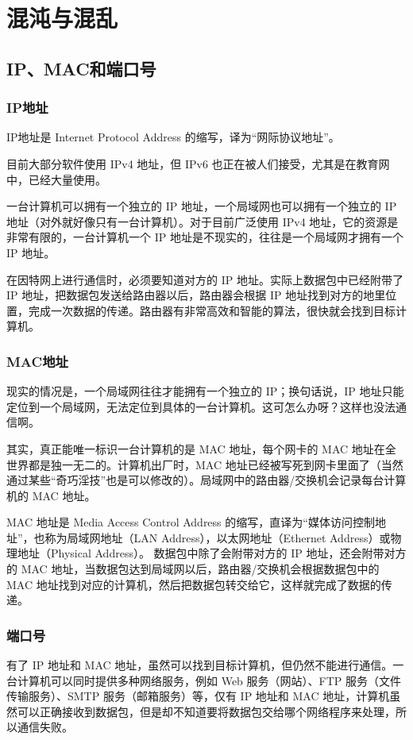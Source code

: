 \documentclass[cn,chinese,color=cyan]{elegantbook}
\begin{document}
\chapter{混沌与混乱}
\section{IP、MAC和端口号}

\subsection{IP地址}

IP地址是 Internet Protocol Address 的缩写，译为“网际协议地址”。

目前大部分软件使用 IPv4 地址，但 IPv6 也正在被人们接受，尤其是在教育网中，已经大量使用。

一台计算机可以拥有一个独立的 IP 地址，一个局域网也可以拥有一个独立的 IP 地址（对外就好像只有一台计算机）。对于目前广泛使用 IPv4 地址，它的资源是非常有限的，一台计算机一个 IP 地址是不现实的，往往是一个局域网才拥有一个 IP 地址。

在因特网上进行通信时，必须要知道对方的 IP 地址。实际上数据包中已经附带了 IP 地址，把数据包发送给路由器以后，路由器会根据 IP 地址找到对方的地里位置，完成一次数据的传递。路由器有非常高效和智能的算法，很快就会找到目标计算机。


\subsection{MAC地址}
现实的情况是，一个局域网往往才能拥有一个独立的 IP；换句话说，IP 地址只能定位到一个局域网，无法定位到具体的一台计算机。这可怎么办呀？这样也没法通信啊。

其实，真正能唯一标识一台计算机的是 MAC 地址，每个网卡的 MAC 地址在全世界都是独一无二的。计算机出厂时，MAC 地址已经被写死到网卡里面了（当然通过某些“奇巧淫技”也是可以修改的）。局域网中的路由器/交换机会记录每台计算机的 MAC 地址。


MAC 地址是 Media Access Control Address 的缩写，直译为“媒体访问控制地址”，也称为局域网地址（LAN Address），以太网地址（Ethernet Address）或物理地址（Physical Address）。
数据包中除了会附带对方的 IP 地址，还会附带对方的 MAC 地址，当数据包达到局域网以后，路由器/交换机会根据数据包中的 MAC 地址找到对应的计算机，然后把数据包转交给它，这样就完成了数据的传递。

\subsection{端口号}
有了 IP 地址和 MAC 地址，虽然可以找到目标计算机，但仍然不能进行通信。一台计算机可以同时提供多种网络服务，例如 Web 服务（网站）、FTP 服务（文件传输服务）、SMTP 服务（邮箱服务）等，仅有 IP 地址和 MAC 地址，计算机虽然可以正确接收到数据包，但是却不知道要将数据包交给哪个网络程序来处理，所以通信失败。
\end{document}
